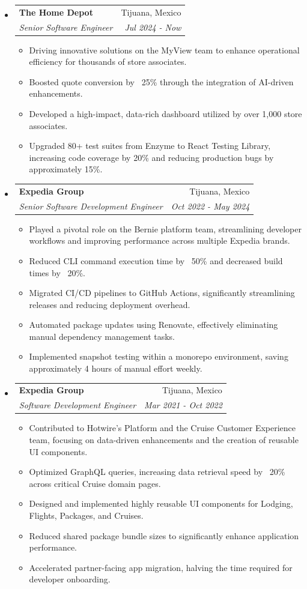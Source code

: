 \documentclass[letterpaper,11pt]{article}
\makeatletter
\newcommand{\resitem}[1]{\item #1 \vspace{-2pt}}
\newcommand{\ressubheading}[4]{
    \begin{tabular*}{6.5in}{p{4.8in}@{\extracolsep{\fill}}r}
            \textbf{#1} & #2 \\
            \textit{#3} & \textit{#4} \\
    \end{tabular*}\vspace{-8pt}}
\makeatother
\begin{document}
      \begin{itemize}
        \item \ressubheading{The Home Depot}{Tijuana, Mexico}{Senior Software Engineer}{Jul 2024 - Now}
        \begin{itemize}
            \resitem{Driving innovative solutions on the MyView team to enhance operational efficiency for thousands of store associates.}
            \resitem{Boosted quote conversion by ~25\% through the integration of AI-driven enhancements.}
            \resitem{Developed a high-impact, data-rich dashboard utilized by over 1,000 store associates.}
            \resitem{Upgraded 80+ test suites from Enzyme to React Testing Library, increasing code coverage by 20\% and reducing production bugs by approximately 15\%.}
        \end{itemize}
        \item \ressubheading{Expedia Group}{Tijuana, Mexico}{Senior Software Development Engineer}{Oct 2022 - May 2024}
        \begin{itemize}
            \resitem{Played a pivotal role on the Bernie platform team, streamlining developer workflows and improving performance across multiple Expedia brands.}
            \resitem{Reduced CLI command execution time by ~50\% and decreased build times by ~20\%.}
            \resitem{Migrated CI/CD pipelines to GitHub Actions, significantly streamlining releases and reducing deployment overhead.}
            \resitem{Automated package updates using Renovate, effectively eliminating manual dependency management tasks.}
            \resitem{Implemented snapshot testing within a monorepo environment, saving approximately 4 hours of manual effort weekly.}
        \end{itemize}
        \item \ressubheading{Expedia Group}{Tijuana, Mexico}{Software Development Engineer}{Mar 2021 - Oct 2022}
        \begin{itemize}
            \resitem{Contributed to Hotwire's Platform and the Cruise Customer Experience team, focusing on data-driven enhancements and the creation of reusable UI components.}
            \resitem{Optimized GraphQL queries, increasing data retrieval speed by ~20\% across critical Cruise domain pages.}
            \resitem{Designed and implemented highly reusable UI components for Lodging, Flights, Packages, and Cruises.}
            \resitem{Reduced shared package bundle sizes to significantly enhance application performance.}
            \resitem{Accelerated partner-facing app migration, halving the time required for developer onboarding.}
        \end{itemize}
      \end{itemize}
\end{document}
